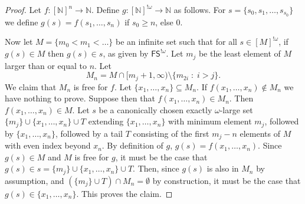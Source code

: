\documentclass[10pt,a4paper]{amsart}
\newcommand{\FS}[0]{\mathsf{FS}}
\newcommand{\NN}[0]{\mathbb{N}}
\begin{document}
\begin{proof}
Let $f:[\NN]^n\to \NN$. Define $g:[\NN]^{!\omega} \to \NN$ as follows. For $s = \{s_0, s_1, \dots, s_{s_0}\}$ we define 
$g(s) = f(s_1, \dots, s_n)$ if $s_0 \geq n$, else $0$. 

Now let $M= \{ m_0 < m_1 < \dots\}$ be an infinite set such that for all $s\in [M]^{!\omega}$, if $g(s) \in M$ then 
$g(s) \in s$, as given by $\FS^{!\omega}$.
Let $m_j$ be the least element of $M$ larger than or equal to $n$. Let 
$$M_n=M \cap [m_j + 1, \infty) \setminus \{ m_{2i} \;:\; i > j \}.$$ 
We claim that $M_n$ is free for $f$. Let $\{x_1, \dots, x_n\}\subseteq M_n$. 
If $f(x_1, \dots, x_n) \notin M_n$ we have nothing to prove. Suppose then that
$f(x_1, \dots, x_n) \in M_n$. Then $f(x_1, \dots, x_n) \in M$. 
Let $s$ be a canonically chosen exactly $\omega$-large set $\{m_j\}\cup \{ x_1, \dots, x_n\} \cup T$
extending $\{x_1, \dots, x_n\}$ with minimum 
element $m_j$, followed by $\{x_1, \dots, x_n\}$, followed by a tail $T$ consisting of the first $m_j - n$ elements of $M$ with even index
beyond $x_n$. 
By definition of $g$, $g(s) = f(x_1, \dots, x_n)$. Since $g(s) \in M$ and $M$ is free for $g$, 
it must be the case that $g(s) \in s=\{m_j\}\cup \{ x_1, \dots, x_n\} \cup T$. Then, since $g(s)$ is also in $M_n$ by assumption, 
and $(\{m_j\}\cup T) \cap M_n = \emptyset$ by construction, 
it must be the case that $g(s) \in \{x_1, \dots, x_n\}$. This proves the claim. 
\end{proof}
\end{document}
